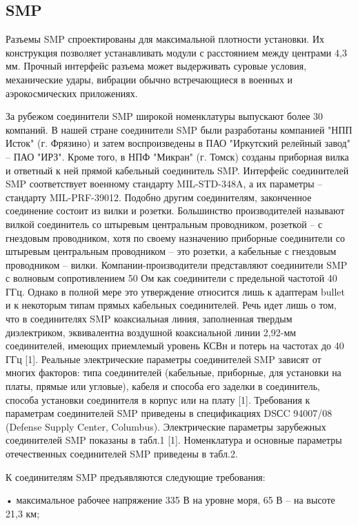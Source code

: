 \documentclass[%
	11pt,
	a4paper,
	utf8,
		]{article}
\begin{document}
\subsection{SMP}

Разъемы SMP спроектированы для максимальной плотности установки. Их конструкция позволяет устанавливать модули с расстоянием между центрами 4,3 мм. Прочный интерфейс разъема может выдерживать суровые условия, механические удары, вибрации обычно встречающиеся в военных и аэрокосмических приложениях.

За рубежом соединители SMP широкой номенклатуры
выпускают более 30 компаний. В  нашей стране
соединители SMP были разработаны компанией
"НПП  Исток" (г. Фрязино) и  затем воспроизведены
в  ПАО  "Иркутский релейный завод"  – ПАО "ИРЗ".
Кроме того, в НПФ "Микран" (г. Томск) созданы приборная вилка и ответный к ней прямой кабельный соединитель SMP.
Интерфейс соединителей SMP соответствует военному стандарту MIL-STD-348A, а их параметры – стандарту MIL-PRF-39012. Подобно другим соединителям,
законченное соединение состоит из  вилки и  розетки.
Большинство производителей называют вилкой соединитель со  штыревым центральным проводником,
розеткой – с гнездовым проводником, хотя по своему
назначению приборные соединители со штыревым центральным проводником  – это розетки, а  кабельные с гнездовым проводником – вилки. 
Компании-производители представляют соединители
SMP с  волновым сопротивлением 50 Ом как соединители с  предельной частотой 40  ГГц. Однако в  полной
мере это утверждение относится лишь к  адаптерам
bullet и  к  некоторым типам прямых кабельных соединителей. Речь идет лишь о том, что в соединителях SMP
коаксиальная линия, заполненная твердым диэлектриком, эквивалентна воздушной коаксиальной линии
2,92-мм соединителей, имеющих приемлемый уровень КСВн и потерь на частотах до 40 ГГц [1]. Реальные
электрические параметры соединителей SMP зависят
от  многих факторов: типа соединителей (кабельные,
приборные, для установки на платы, прямые или угловые), кабеля и способа его заделки в соединитель, способа установки соединителя в корпус или на плату [1].
Требования к  параметрам соединителей SMP приведены в спецификациях DSСC 94007/08 (Defense Supply
Center, Columbus). Электрические параметры зарубежных соединителей SMP показаны в табл.1 [1].
Номенклатура и  основные параметры отечественных соединителей SMP приведены в табл.2.

К соединителям SMP предъявляются следующие
требования:

•	 максимальное рабочее напряжение 335 В на уровне
моря, 65 В – на высоте 21,3 км;
\end{document}
